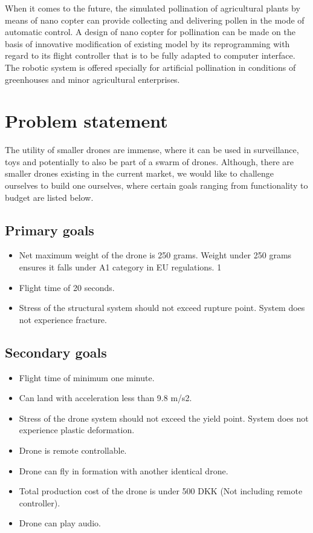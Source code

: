 \documentclass[titlepage,a4paper,11pt]{article}
\begin{document}
When it comes to the future, the simulated pollination of agricultural plants by means of nano copter can provide collecting and delivering pollen in the mode of automatic control. A design of nano copter for pollination can be made on the basis of innovative modification of existing model by its reprogramming with regard to its flight controller that is to be fully adapted to computer interface. The robotic system is offered specially for artificial pollination in conditions of greenhouses and minor agricultural enterprises. \cite{Abutalipov2016}


\section{Problem statement}

The utility of smaller drones are immense, where it can be used in surveillance, toys and potentially to also be part of a swarm of drones. Although, there are smaller drones existing in the current market, we would like to challenge ourselves to build one ourselves, where certain goals ranging from functionality to budget are listed below.


\subsection{Primary goals }
\begin{itemize}
    \item
          Net maximum weight of the drone is 250 grams. Weight under 250 grams ensures it falls under A1 category in EU regulations. 1
    \item
          Flight time of 20 seconds.
    \item
          Stress of the structural system should not exceed rupture point. System does not experience fracture.
\end{itemize}


\subsection{Secondary goals}
\begin{itemize}
    \item
          Flight time of minimum one minute.
    \item
          Can land with acceleration less than 9.8 m/s2.
    \item
          Stress of the drone system should not exceed the yield point. System does not experience plastic deformation.
    \item
          Drone is remote controllable.
    \item
          Drone can fly in formation with another identical drone.
    \item
          Total production cost of the drone is under 500 DKK (Not including remote controller).
    \item
          Drone can play audio.
\end{itemize}
\end{document}
